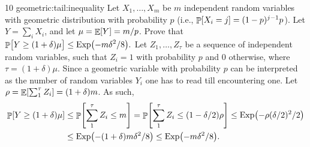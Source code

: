 %
{10}%
{geometric:tail:inequality}{%
   Let $X_1, \ldots, X_m$ be $m$ independent random variables with
   geometric distribution with probability $p$ (i.e., $\Prob{X_i = j}
   = (1-p)^{j-1} p$). Let $Y = \sum_{i} X_i$, and let $\mu = \mathop{\mathbb{E}}\!\left[ {Y} \right] =
   m/p$. Prove that
   \begin{math}
       \ds \Prob{\bigl. Y \geq (1+\delta) \mu \MakesBig }%
       \leq%
       \Exp \pth[]{ - \nfrac{m \delta^2}{8}}.
   \end{math}%
}{%
   Let $Z_1, \ldots, Z_\tau$ be a sequence of independent random
   variables, such that $Z_i=1$ with probability $p$ and $0$
   otherwise, where $\tau = (1+\delta) \mu$. Since a geometric
   variable with probability $p$ can be interpreted as the number of
   random variables $Y_i$ one has to read till encountering one. Let
   $\rho = \mathop{\mathbb{E}}\!\left[ {\sum_{1}^{\tau} Z_i} \right] = (1+\delta)m$.  As such,
   \begin{align*}
     \Prob{Y \geq (1+\delta) \mu }%
     &\leq %
       \Prob{\sum_{1}^{\tau} Z_i \leq m}%
       =%
       \Prob{\sum_{1}^{\tau} Z_i \leq (1-\delta/2)\rho }%
       \leq%
       \Exp\pth{ - \rho (\delta/2)^2/ 2 }\\
     &\leq%
       \Exp\pth{ - (1+\delta)m \delta^2/ 8 }%
       \leq%
       \Exp\pth{ -m \delta^2/ 8 }.
   \end{align*}
}


\ChapterEnd{}


